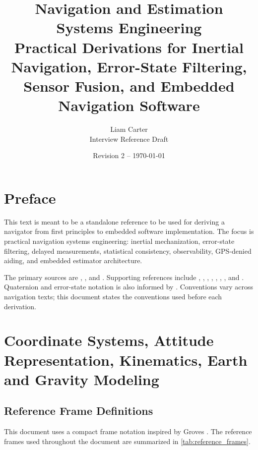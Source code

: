 \documentclass[11pt,oneside]{book}
\title{Navigation and Estimation Systems Engineering\\\large Practical Derivations for Inertial Navigation, Error-State Filtering, Sensor Fusion, and Embedded Navigation Software}
\author{Liam Carter\\Interview Reference Draft}
\date{Revision 2 -- \today}
\begin{document}
\frontmatter
\maketitle
\tableofcontents
\clearpage
\chapter*{Preface}
This text is meant to be a standalone reference to be used for deriving a navigator from first principles to embedded software implementation. The focus is practical navigation systems engineering: inertial mechanization, error-state filtering, delayed measurements, statistical consistency, observability, GPS-denied aiding, and embedded estimator architecture.

The primary sources are \cite{groves2013}, \cite{titterton2004}, and \cite{simon2006}. Supporting references include \cite{farrell2008}, \cite{brown2012}, \cite{barshalom2001}, \cite{gelb1974}, \cite{maybeck1979}, \cite{kaplan2017}, \cite{grewal2020}, and \cite{vanloan1978}. Quaternion and error-state notation is also informed by \cite{sola2018}. Conventions vary across navigation texts; this document states the conventions used before each derivation.

\mainmatter

\chapter{Coordinate Systems, Attitude Representation, Kinematics, Earth and Gravity Modeling}

\section{Reference Frame Definitions}

This document uses a compact frame notation inspired by Groves \cite{groves2013}. The reference frames used throughout the document are summarized in \cref{tab:reference_frames}.
\end{document}
